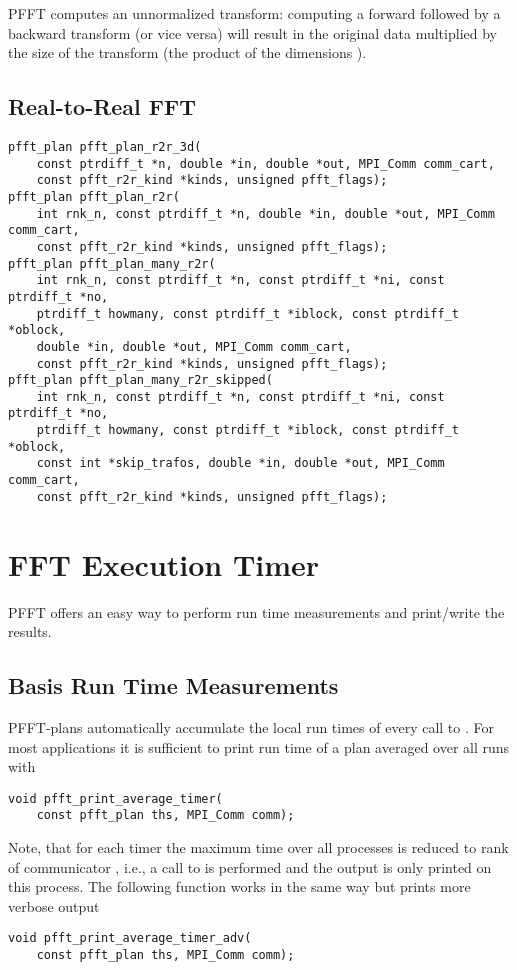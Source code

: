 PFFT computes an unnormalized transform: computing a forward followed by a backward transform (or vice versa) will result
in the original data multiplied by the size of the transform (the product of the dimensions ).


\subsection{Real-to-Real FFT}
\begin{lstlisting}
pfft_plan pfft_plan_r2r_3d(
    const ptrdiff_t *n, double *in, double *out, MPI_Comm comm_cart,
    const pfft_r2r_kind *kinds, unsigned pfft_flags);
pfft_plan pfft_plan_r2r(
    int rnk_n, const ptrdiff_t *n, double *in, double *out, MPI_Comm comm_cart,
    const pfft_r2r_kind *kinds, unsigned pfft_flags);
pfft_plan pfft_plan_many_r2r(
    int rnk_n, const ptrdiff_t *n, const ptrdiff_t *ni, const ptrdiff_t *no,
    ptrdiff_t howmany, const ptrdiff_t *iblock, const ptrdiff_t *oblock,
    double *in, double *out, MPI_Comm comm_cart,
    const pfft_r2r_kind *kinds, unsigned pfft_flags);
pfft_plan pfft_plan_many_r2r_skipped(
    int rnk_n, const ptrdiff_t *n, const ptrdiff_t *ni, const ptrdiff_t *no,
    ptrdiff_t howmany, const ptrdiff_t *iblock, const ptrdiff_t *oblock,
    const int *skip_trafos, double *in, double *out, MPI_Comm comm_cart,
    const pfft_r2r_kind *kinds, unsigned pfft_flags);
\end{lstlisting}

\section{FFT Execution Timer}
PFFT offers an easy way to perform run time measurements and print/write the results.

\subsection{Basis Run Time Measurements}
PFFT-plans automatically accumulate the local run times of every call to .
For most applications it is sufficient to print run time of a plan  averaged over all runs with
\begin{lstlisting}
void pfft_print_average_timer(
    const pfft_plan ths, MPI_Comm comm);
\end{lstlisting}
Note, that for each timer the maximum time over all processes is reduced to rank  of communicator ,
i.e., a call to  is performed and the output is only printed on this process.
The following function works in the same way but prints more verbose output
\begin{lstlisting}
void pfft_print_average_timer_adv(
    const pfft_plan ths, MPI_Comm comm);
\end{lstlisting}

